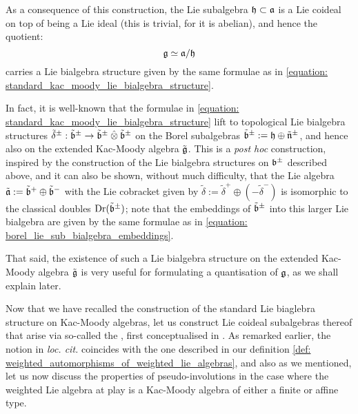         As a consequence of this construction, the Lie subalgebra $\mathfrak{h} \subset \mathfrak{a}$ is a Lie coideal on top of being a Lie ideal (this is trivial, for it is abelian), and hence the quotient:
            $$\mathfrak{g} \simeq \mathfrak{a}/\mathfrak{h}$$
        carries a Lie bialgebra structure given by the same formulae as in \eqref{equation: standard_kac_moody_lie_bialgebra_structure}.
        \begin{remark}
            In fact, it is well-known that the formulae in \eqref{equation: standard_kac_moody_lie_bialgebra_structure} lift to topological Lie bialgebra structures $\tilde{\delta}^{\pm}: \tilde{\b}^{\pm} \to \tilde{\b}^{\pm} \hattensor \tilde{\b}^{\pm}$ on the Borel subalgebras $\tilde{\mathfrak{b}}^{\pm} := \mathfrak{h} \oplus \tilde{\mathfrak{n}}^{\pm}$, and hence also on the extended Kac-Moody algebra $\tilde{\mathfrak{g}}$. This is a \textit{post hoc} construction, inspired by the construction of the Lie bialgebra structures on $\mathfrak{b}^{\pm}$ described above, and it can also be shown, without much difficulty, that the Lie algebra $\tilde{\mathfrak{a}} := \tilde{\mathfrak{b}}^+ \oplus \tilde{\mathfrak{b}}^-$ with the Lie cobracket given by $\tilde{\delta} := \tilde{\delta}^+ \oplus (-\tilde{\delta}^-)$ is isomorphic to the classical doubles $\operatorname{Dr}(\tilde{\mathfrak{b}}^{\pm})$; note that the embeddings of $\tilde{\mathfrak{b}}^{\pm}$ into this larger Lie bialgebra are given by the same formulae as in \eqref{equation: borel_lie_sub_bialgebra_embeddings}. 

            That said, the existence of such a Lie bialgebra structure on the extended Kac-Moody algebra $\tilde{\mathfrak{g}}$ is very useful for formulating a quantisation of $\mathfrak{g}$, as we shall explain later. 
        \end{remark}

        Now that we have recalled the construction of the standard Lie biaglebra structure on Kac-Moody algebras, let us construct Lie coideal subalgebras thereof that arise via so-called the , first conceptualised in \cite[Definition 1.1]{regelskis_vlaar_kac_moody_pseudo_symmetric_pairs}. As remarked earlier, the notion in \textit{loc. cit.} coincides with the one described in our definition \ref{def: weighted_automorphisms_of_weighted_lie_algebras}, and also as we mentioned, let us now discuss the properties of pseudo-involutions in the case where the weighted Lie algebra at play is a Kac-Moody algebra of either a finite or affine type.
        
